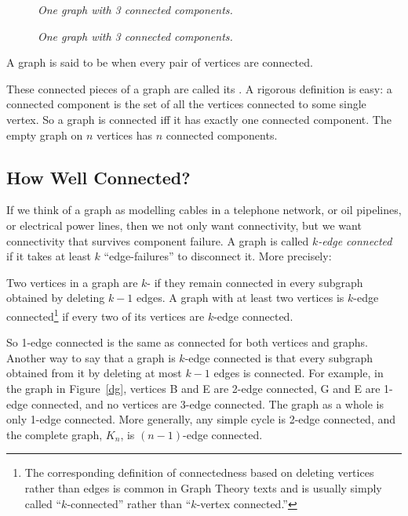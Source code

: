 \begin{staffnotes}

\begin{figure}
\caption{\em One graph with 3 connected components.}
\label{fig:3comp}
\end{figure}

\end{staffnotes}

\begin{figure}
\caption{\em One graph with 3 connected components.}
\label{fig:3comp}
\end{figure}

\begin{definition}\label{def:connected-graph}
A graph is said to be  when every pair of vertices are
connected.
\end{definition}
These connected pieces of a graph are called its .  A rigorous definition is easy: a connected component is the
set of all the vertices connected to some single vertex.  So a graph is
connected iff it has exactly one connected component.  The empty graph on
$n$ vertices has $n$ connected components.

\subsection{How Well Connected?}
If we think of a graph as modelling cables in a telephone network, or
oil pipelines, or electrical power lines, then we not only want
connectivity, but we want connectivity that survives component
failure.  A graph is called \emph{$k$-edge connected} if it takes at
least $k$ ``edge-failures'' to disconnect it.  More precisely:

\begin{definition}
  Two vertices in a graph are $k$- if they remain
  connected in every subgraph obtained by deleting $k-1$ edges.  A graph
  with at least two vertices is $k$-edge connected\footnote{The
    corresponding definition of connectedness based on deleting vertices
    rather than edges is common in Graph Theory texts and is usually
    simply called ``$k$-connected'' rather than ``$k$-vertex connected.''}
  if every two of its vertices are $k$-edge connected.
\end{definition}

So 1-edge connected is the same as connected for both vertices and graphs.
Another way to say that a graph is $k$-edge connected is that every
subgraph obtained from it by deleting at most $k-1$ edges is connected.
For example, in the graph in Figure~\ref{dg}, vertices B and E are 2-edge
connected, G and E are 1-edge connected, and no vertices are 3-edge
connected.  The graph as a whole is only 1-edge connected.  More
generally, any simple cycle is 2-edge connected, and the complete graph,
$K_n$, is $(n-1)$-edge connected.

